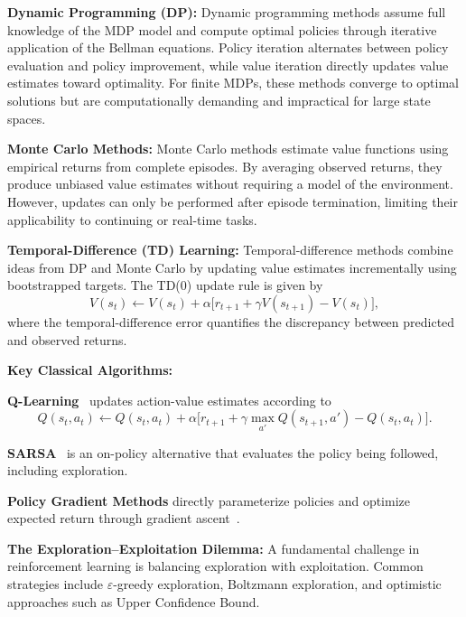 \textbf{Dynamic Programming (DP):}  
Dynamic programming methods assume full knowledge of the MDP model and compute optimal policies through iterative application of the Bellman equations. Policy iteration alternates between policy evaluation and policy improvement, while value iteration directly updates value estimates toward optimality. For finite MDPs, these methods converge to optimal solutions but are computationally demanding and impractical for large state spaces.

\textbf{Monte Carlo Methods:}  
Monte Carlo methods estimate value functions using empirical returns from complete episodes. By averaging observed returns, they produce unbiased value estimates without requiring a model of the environment. However, updates can only be performed after episode termination, limiting their applicability to continuing or real-time tasks.

\textbf{Temporal-Difference (TD) Learning:}  
Temporal-difference methods combine ideas from DP and Monte Carlo by updating value estimates incrementally using bootstrapped targets. The TD(0) update rule is given by
\begin{equation}
V(s_t) \leftarrow V(s_t) + \alpha\big[r_{t+1} + \gamma V(s_{t+1}) - V(s_t)\big],
\label{eq:td0_update}
\end{equation}
where the temporal-difference error quantifies the discrepancy between predicted and observed returns.

\textbf{Key Classical Algorithms:}

\textbf{Q-Learning}~\cite{watkins1992q} updates action-value estimates according to
\begin{equation}
Q(s_t,a_t) \leftarrow Q(s_t,a_t) + \alpha\big[r_{t+1} + \gamma \max_{a'} Q(s_{t+1},a') - Q(s_t,a_t)\big].
\label{eq:q_learning_update}
\end{equation}

\textbf{SARSA}~\cite{rummery1994line} is an on-policy alternative that evaluates the policy being followed, including exploration.

\textbf{Policy Gradient Methods} directly parameterize policies and optimize expected return through gradient ascent~\cite{sutton1999policy,williams1992simple}.

\textbf{The Exploration–Exploitation Dilemma:}  
A fundamental challenge in reinforcement learning is balancing exploration with exploitation. Common strategies include $\varepsilon$-greedy exploration, Boltzmann exploration, and optimistic approaches such as Upper Confidence Bound.

